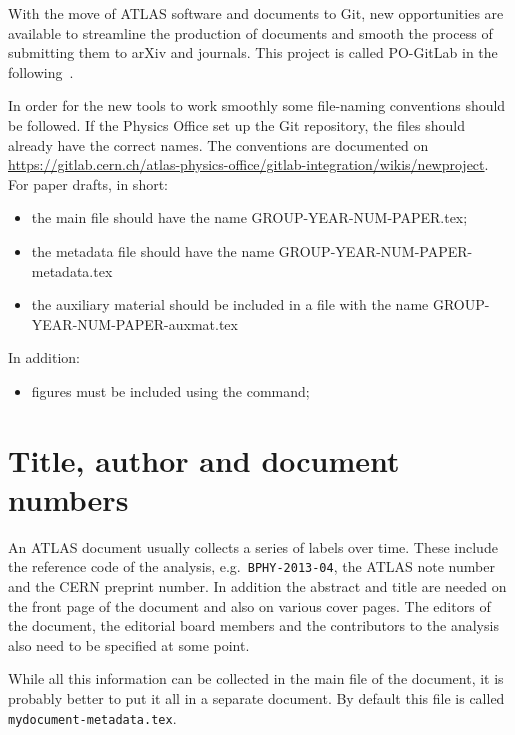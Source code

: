 With the move of ATLAS software and documents to Git,
new opportunities are available to streamline the production of documents
and smooth the process of submitting them to arXiv and journals.
This project is called PO-GitLab in the following~\cite{atlas-PO-gitlab}.

In order for the new tools to work smoothly some file-naming conventions should be followed.
If the Physics Office set up the Git repository, the files should already have the correct names.
The conventions are documented on
\url{https://gitlab.cern.ch/atlas-physics-office/gitlab-integration/wikis/newproject}.
For paper drafts, in short:
\begin{itemize}
  \item the main file should have the name GROUP-YEAR-NUM-PAPER.tex;
  \item the metadata file should have the name GROUP-YEAR-NUM-PAPER-metadata.tex
  \item the auxiliary material should be included in a file with the name GROUP-YEAR-NUM-PAPER-auxmat.tex
\end{itemize}

In addition:
\begin{itemize}
  \item figures must be included using the  command;
\end{itemize}

\section{Title, author and document numbers}
\label{sec:metadata}

An ATLAS document usually collects a series of labels over time.
These include the reference code of the analysis, e.g.\ \texttt{BPHY-2013-04}, 
the ATLAS note number and the CERN preprint number.
In addition the abstract and title are needed on the front page of the document and also on various cover pages.
The editors of the document, the editorial board members and the contributors to the analysis
also need to be specified at some point.

While all this information can be collected in the main file of the document, 
it is probably better to put it all in a separate document.
By default this file is called \texttt{mydocument-metadata.tex}.

